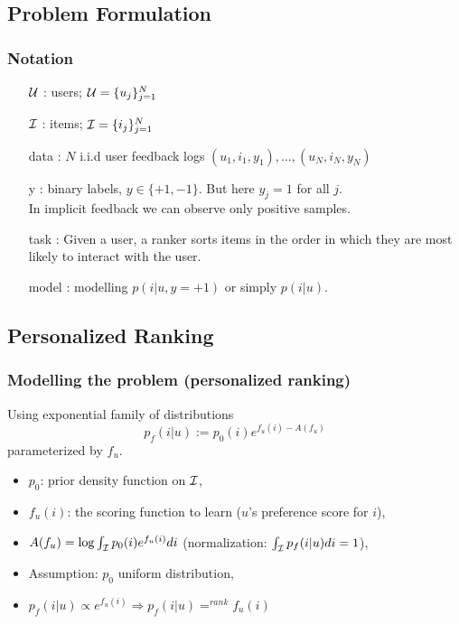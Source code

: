 \documentclass{beamer}
\begin{document}
\subsection{Problem Formulation}
\begin{frame}
\frametitle{Notation} 
\begin{block}{}
\begin{itemize}
\item[$\cal{U}$]: users; ${\cal{U}} = \{u_j\}_{j=1}^N$
\item[$\cal I$]: items; ${\cal{I}} = \{i_j\}_{j=1}^N$
\item[data]: $N$ i.i.d user feedback logs $(u_1, i_1, y_1), \ldots, (u_N, i_N, y_N)$ 
\item[y]: binary labels, $y \in \{+1, -1\}$. But here $y_j=1$ for all $j$. \\ 
{\footnotesize In implicit feedback we can observe only positive samples.}
\item[task]: Given a user, a ranker sorts items in the order in which they are most likely to interact with the user. 
\item[model]: modelling $p(i|u, y=+1)$ or simply $p(i|u)$.
\end{itemize} \vspace{3mm}
\end{block} 
\end{frame}


\subsection{Personalized Ranking}

\begin{frame}
\frametitle{Modelling the problem (personalized ranking)} 
\begin{block}{Using exponential family of distributions}
$$p_f(i|u) := p_0(i) e^{f_u(i) - A(f_u)}$$
parameterized by $f_u$. \vspace{3mm}
\begin{itemize} \pause
\item $p_0$: prior density function on $\cal I$, \pause  \vspace{1mm}
\item $f_u(i)$: the scoring function to learn ($u$'s preference score for $i$), \pause  \vspace{1mm}
\item $A(f_u) = \log \int_{\cal I} p_0(i) e^{f_u(i)} di$ (normalization: $\int_{\cal I} p_f(i|u) di = 1$), \pause  \vspace{1mm}
\item Assumption: $p_0$ uniform distribution, \pause \vspace{1mm}
\item $p_f(i|u) \propto e^{f_u(i)} \Longrightarrow p_f(i|u) =^{rank} f_u(i)$
\end{itemize}
\end{block} 
\end{frame}
\end{document}
